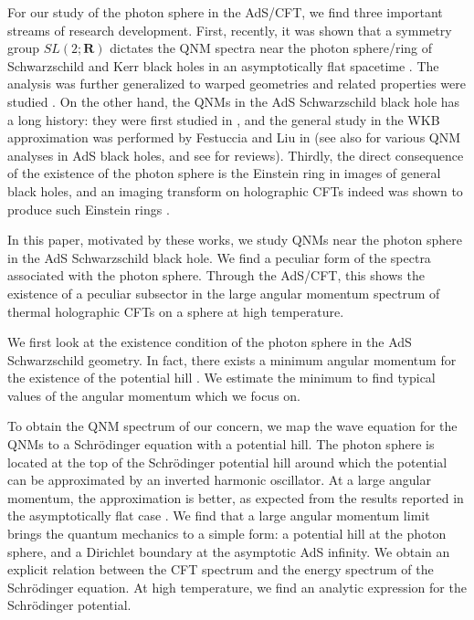 \documentclass[a4paper,11pt]{article}
\begin{document}
For our study of the photon sphere in the AdS/CFT, we find three important streams of research development.
First, recently, it was shown that a symmetry group $SL(2;\mathbf{R})$ dictates the QNM spectra near the photon sphere/ring of Schwarzschild and Kerr black holes in an asymptotically flat spacetime \cite{Raffaelli:2021gzh,Hadar:2022xag}. 
The analysis was further generalized to warped geometries \cite{Kapec:2022dvc,Chen:2023zvd} and related properties were studied \cite{Chen:2022fpl,Fransen:2023eqj}. 
On the other hand, the QNMs in the AdS Schwarzschild black hole has a long history:
they were first studied in \cite{Chan:1996yk,Horowitz:1999jd,KalyanaRama:1999zj}, and the general study in the WKB approximation was performed by Festuccia and Liu in \cite{Festuccia:2008zx} (see also \cite{Cardoso:2001bb,Moss:2001ga,Starinets:2002br,Konoplya:2002zu,Michalogiorgakis:2006jc,Siopsis:2007wn,Miranda:2008vb,Cardoso:2008bp,Daghigh:2008jz,Miranda:2009uw,Berti:2009wx,Denef:2009kn,Morgan:2009pn,Morgan:2009vg,Daghigh:2009fy,Gannot:2012pb,Aragon:2020tvq,Daghigh:2022uws,Fortuna:2022fdd} for various QNM analyses in AdS black holes, and see \cite{Berti:2009kk,Konoplya:2011qq} for reviews).
Thirdly, the direct consequence of the existence of the photon sphere is the Einstein ring in images of general black holes, and an imaging transform on holographic CFTs indeed was shown to produce such Einstein rings
\cite{Hashimoto:2018okj,Hashimoto:2019jmw}. 

In this paper, motivated by these works, we study QNMs near the photon sphere in the 
AdS Schwarzschild black hole. 
We find a peculiar form of the spectra associated with the photon sphere. 
Through the AdS/CFT, this shows the existence of a peculiar subsector in the large angular momentum spectrum of thermal holographic CFTs on a sphere at high temperature.


We first look at the existence condition of the photon sphere in the AdS Schwarzschild geometry. In fact, there exists a minimum angular momentum for the existence of the potential hill \cite{Festuccia:2008zx}. 
We estimate the minimum to find typical values of the angular momentum which we focus on.

To obtain the QNM spectrum of our concern, we map the wave equation for the QNMs to a Schr\"odinger equation with 
a potential hill. The photon sphere is located at the top of the Schr\"odinger potential hill around which the potential can be approximated by an inverted harmonic oscillator. 
At a large angular momentum, the approximation is better, as expected from the results reported in the asymptotically flat case \cite{Hadar:2022xag}. 
We find that a large angular momentum limit brings the quantum mechanics to a simple form: a potential hill at the photon sphere, and a
Dirichlet boundary at the asymptotic AdS infinity. We obtain an explicit relation between the CFT spectrum and the energy spectrum of the Schr\"odinger equation. At high temperature, we find an analytic expression for the Schr\"odinger potential. 
\end{document}

